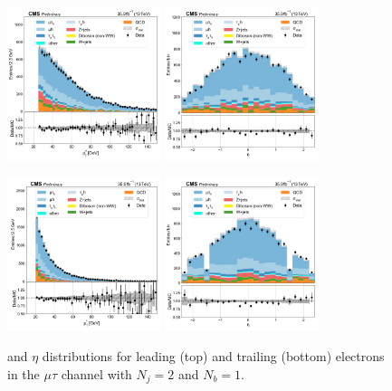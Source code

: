 \begin{figure}[htb!]
    \centering
    \includegraphics[width=0.4\textwidth]{chapters/Appendix/sectionPlots/figures/data_mc_overlays/mutau_2016_cat_eq2_eq1_signal_linear_lepton_lepton1_pt}
    \includegraphics[width=0.4\textwidth]{chapters/Appendix/sectionPlots/figures/data_mc_overlays/mutau_2016_cat_eq2_eq1_signal_linear_lepton_lepton1_eta}

    \includegraphics[width=0.4\textwidth]{chapters/Appendix/sectionPlots/figures/data_mc_overlays/mutau_2016_cat_eq2_eq1_signal_linear_lepton_lepton2_pt}
    \includegraphics[width=0.4\textwidth]{chapters/Appendix/sectionPlots/figures/data_mc_overlays/mutau_2016_cat_eq2_eq1_signal_linear_lepton_lepton2_eta}
    \caption{\pt and $\eta$ distributions for leading (top) and trailing
        (bottom) electrons in the $\mu\tau$ channel with $N_{j} = 2$ and
        $N_{b} = 1$.}
    \label{fig:mutau_5_kinematic}
\end{figure}

